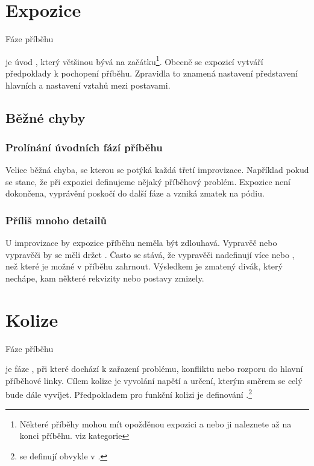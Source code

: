 \documentclass[main.tex]{subfiles}
\begin{document}
\needspace{5cm} \section{Expozice} \label{expozice} {{Fáze příběhu}} 
 
 je úvod , který většinou bývá na začátku\footnote{Některé příběhy mohou mít opožděnou expozici a nebo ji naleznete až na konci příběhu. viz kategorie }. Obecně se expozicí vytváří předpoklady k pochopení příběhu. Zpravidla to znamená nastavení  představení hlavních  a nastavení vztahů mezi postavami. 
 
\subsection{ Běžné chyby }  
\subsubsection{ Prolínání úvodních fází příběhu } Velice běžná chyba, se kterou se potýká každá třetí improvizace. Například pokud se stane, že při expozici definujeme nějaký příběhový problém. Expozice není dokončena, vyprávění poskočí do další fáze a vzniká zmatek na pódiu. 
 
\subsubsection{ Příliš mnoho detailů } U  improvizace by expozice příběhu neměla být zdlouhavá. Vypravěč nebo vypravěči by se měli držet . Často se stává, že vypravěči nadefinují více  nebo , než které je možné v příběhu zahrnout. Výsledkem je zmatený divák, který nechápe, kam některé rekvizity nebo postavy zmizely. 
 
  
 
 
 
\needspace{5cm} \section{Kolize} \label{kolize} {{Fáze příběhu}} 
 
 je fáze , při které dochází k zařazení problému, konfliktu nebo rozporu do hlavní příběhové linky. Cílem kolize je vyvolání napětí a určení, kterým směrem se celý  bude dále vyvíjet. Předpokladem pro funkční kolizi je definování .\footnote{ se definují obvykle v .} 
 
\end{document}
